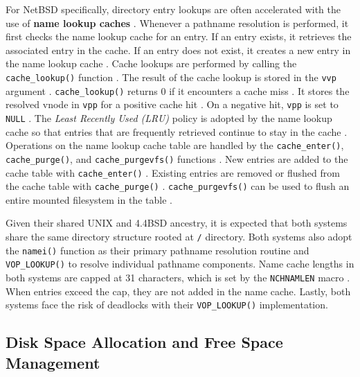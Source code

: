 For NetBSD specifically, directory entry lookups are often accelerated with the use of \textbf{name lookup caches} \parencite{netbsd_namecache}.
Whenever a pathname resolution is performed, it first checks the name lookup cache for an entry. If an entry exists, it retrieves the
associated entry in the cache. If an entry does not exist, it creates a new entry in the name lookup cache \parencite{netbsd_namecache}.
Cache lookups are performed by calling the \texttt{cache\_lookup()} function \parencite{netbsd_namecache}. The result of the cache lookup
is stored in the \texttt{vvp} argument \parencite{netbsd_namecache}. \texttt{cache\_lookup()} returns 0 if it encounters a cache miss
\parencite{netbsd_namecache}. It stores the resolved vnode in \texttt{vpp} for a positive cache hit \parencite{netbsd_namecache}. On
a negative hit, \texttt{vpp} is set to \texttt{NULL} \parencite{netbsd_namecache}. The \textit{Least Recently Used (LRU)} policy
is adopted by the name lookup cache so that entries that are frequently retrieved continue to stay in the cache \parencite{netbsd_namecache}.
Operations on the name lookup cache table are handled by the \texttt{cache\_enter()}, \texttt{cache\_purge()}, and \texttt{cache\_purgevfs()}
functions \parencite{netbsd_namecache}. New entries are added to the cache table with \texttt{cache\_enter()} \parencite{netbsd_namecache}.
Existing entries are removed or flushed from the cache table with \texttt{cache\_purge()} \parencite{netbsd_namecache}.
\texttt{cache\_purgevfs()} can be used to flush an entire mounted filesystem in the table \parencite{netbsd_namecache}.

Given their shared UNIX and 4.4BSD ancestry, it is expected that both systems share the same directory structure rooted at \texttt{/}
directory. Both systems also adopt the \texttt{namei()} function as their primary pathname resolution routine and \texttt{VOP\_LOOKUP()}
to resolve individual pathname components. Name cache lengths in both systems are capped at 31 characters, which is set by the
\texttt{NCHNAMLEN} macro \parencites{netbsd_namecache}{freebsd_namecache}. When entries exceed the cap, they are not added in the
name cache. Lastly, both systems face the risk of deadlocks with their \texttt{VOP\_LOOKUP()} implementation.

\subsection{Disk Space Allocation and Free Space Management} \label{space-allocation-and-free-space} %

